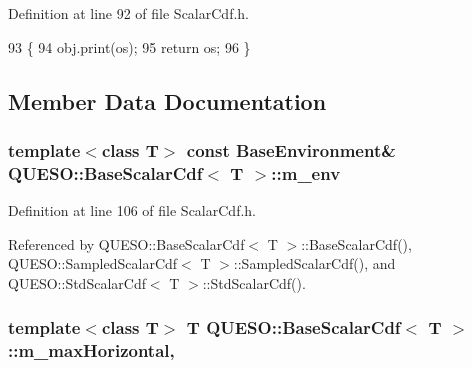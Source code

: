 Definition at line 92 of file Scalar\-Cdf.\-h.


\begin{DoxyCode}
93                                    \{
94     obj.print(os);
95     \textcolor{keywordflow}{return} os;
96   \}
\end{DoxyCode}


\subsection{Member Data Documentation}
\hypertarget{class_q_u_e_s_o_1_1_base_scalar_cdf_a3caa986ae1ccef96a28b0365fb88c86c}{
\subsubsection[{m\-\_\-env}]{\setlength{\rightskip}{0pt plus 5cm}template$<$class T$>$ const {\bf Base\-Environment}\& {\bf Q\-U\-E\-S\-O\-::\-Base\-Scalar\-Cdf}$<$ T $>$\-::m\-\_\-env\hspace{0.3cm}{\ttfamily [protected]}}}\label{class_q_u_e_s_o_1_1_base_scalar_cdf_a3caa986ae1ccef96a28b0365fb88c86c}


Definition at line 106 of file Scalar\-Cdf.\-h.



Referenced by Q\-U\-E\-S\-O\-::\-Base\-Scalar\-Cdf$<$ T $>$\-::\-Base\-Scalar\-Cdf(), Q\-U\-E\-S\-O\-::\-Sampled\-Scalar\-Cdf$<$ T $>$\-::\-Sampled\-Scalar\-Cdf(), and Q\-U\-E\-S\-O\-::\-Std\-Scalar\-Cdf$<$ T $>$\-::\-Std\-Scalar\-Cdf().

\hypertarget{class_q_u_e_s_o_1_1_base_scalar_cdf_a33beb9b7e610a4fe1458080593982d2e}{
\subsubsection[{m\-\_\-max\-Horizontal}]{\setlength{\rightskip}{0pt plus 5cm}template$<$class T$>$ T {\bf Q\-U\-E\-S\-O\-::\-Base\-Scalar\-Cdf}$<$ T $>$\-::m\-\_\-max\-Horizontal\hspace{0.3cm}{\ttfamily [mutable]}, {\ttfamily [protected]}}}\label{class_q_u_e_s_o_1_1_base_scalar_cdf_a33beb9b7e610a4fe1458080593982d2e}


